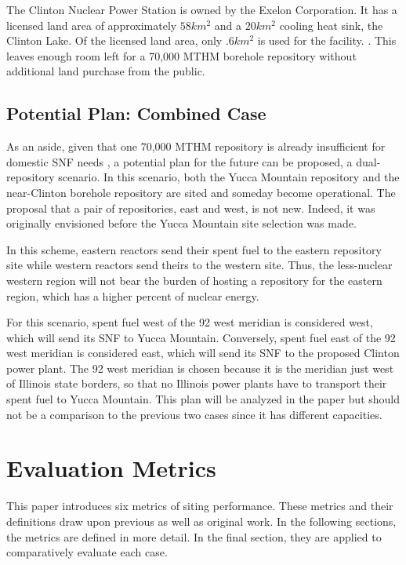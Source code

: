 The Clinton Nuclear Power Station is owned by the Exelon Corporation. It has a 
licensed land area of approximately $58km^2$ and a $20km^2$ cooling heat sink, 
the Clinton Lake. Of the licensed land area, only $.6km^2$ is used for the facility.  
\cite{nrc_chapter_2007}.  This leaves enough room left for a 70,000 \gls{MTHM} 
borehole repository without additional land purchase from the public.

\subsection{Potential Plan: Combined Case}
As an aside, given that one 70,000 \gls{MTHM} repository is already insufficient for 
domestic \gls{SNF} needs \cite{doe_report_2008}, a potential plan for the future can be proposed, 
a dual-repository scenario. In this scenario, both the Yucca Mountain 
repository and the near-Clinton borehole repository are sited and someday 
become operational. The proposal that a pair of repositories, east and west, is 
not new. Indeed, it was originally envisioned before the Yucca Mountain site 
selection was made.

In this scheme, eastern reactors send their spent fuel to the eastern 
repository site while western reactors send theirs to the western site. Thus, 
the less-nuclear western region will not bear the burden of hosting a 
repository for the eastern region, which has a higher percent of nuclear 
energy. 

For this scenario, spent fuel west of the 92 west meridian is considered west, 
which will send its \gls{SNF} to Yucca Mountain. Conversely, spent fuel east of the 92 west
meridian is considered east, which will send its \gls{SNF} to the proposed Clinton 
power plant. The 92 west meridian is chosen because it is the meridian just west of
Illinois state borders, so that no Illinois power plants have to transport their
spent fuel to Yucca Mountain. This plan will be analyzed in the paper but should
not be a comparison to the previous two cases since it has different capacities. %



\section{Evaluation Metrics}

This paper introduces six metrics of siting performance. These metrics and 
their definitions draw upon previous 
\cite{freeze_siting_2015,waleed_regional_2015} as well as original work.  In 
the following sections, the metrics are defined in more detail. In the final 
section, they are applied to comparatively evaluate each case.

